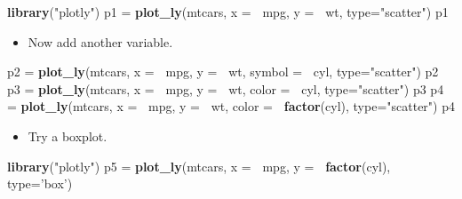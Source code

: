 \documentclass[]{article}
\newenvironment{Shaded}{\begin{snugshade}}{\end{snugshade}}
\newcommand{\DataTypeTok}[1]{\textcolor[rgb]{0.13,0.29,0.53}{#1}}
\newcommand{\KeywordTok}[1]{\textcolor[rgb]{0.13,0.29,0.53}{\textbf{#1}}}
\newcommand{\NormalTok}[1]{#1}
\newcommand{\OperatorTok}[1]{\textcolor[rgb]{0.81,0.36,0.00}{\textbf{#1}}}
\newcommand{\StringTok}[1]{\textcolor[rgb]{0.31,0.60,0.02}{#1}}
\providecommand{\tightlist}{%
  \setlength{\itemsep}{0pt}\setlength{\parskip}{0pt}}
\begin{document}
\begin{Shaded}
\begin{Highlighting}[]
\KeywordTok{library}\NormalTok{(}\StringTok{"plotly"}\NormalTok{)}
\NormalTok{p1 =}\StringTok{ }\KeywordTok{plot_ly}\NormalTok{(mtcars, }\DataTypeTok{x =} \OperatorTok{~}\NormalTok{mpg, }\DataTypeTok{y =} \OperatorTok{~}\NormalTok{wt, }\DataTypeTok{type=}\StringTok{"scatter"}\NormalTok{) }
\NormalTok{p1}
\end{Highlighting}
\end{Shaded}

\begin{itemize}
\tightlist
\item
  Now add another variable.
\end{itemize}

\begin{Shaded}
\begin{Highlighting}[]
\NormalTok{p2 =}\StringTok{ }\KeywordTok{plot_ly}\NormalTok{(mtcars, }\DataTypeTok{x =} \OperatorTok{~}\NormalTok{mpg, }\DataTypeTok{y =} \OperatorTok{~}\NormalTok{wt, }\DataTypeTok{symbol =} \OperatorTok{~}\NormalTok{cyl, }\DataTypeTok{type=}\StringTok{"scatter"}\NormalTok{) }
\NormalTok{p2}
\NormalTok{p3 =}\StringTok{ }\KeywordTok{plot_ly}\NormalTok{(mtcars, }\DataTypeTok{x =} \OperatorTok{~}\NormalTok{mpg, }\DataTypeTok{y =} \OperatorTok{~}\NormalTok{wt, }\DataTypeTok{color =} \OperatorTok{~}\NormalTok{cyl, }\DataTypeTok{type=}\StringTok{"scatter"}\NormalTok{) }
\NormalTok{p3}
\NormalTok{p4 =}\StringTok{ }\KeywordTok{plot_ly}\NormalTok{(mtcars, }\DataTypeTok{x =} \OperatorTok{~}\NormalTok{mpg, }\DataTypeTok{y =} \OperatorTok{~}\NormalTok{wt, }\DataTypeTok{color =} \OperatorTok{~}\KeywordTok{factor}\NormalTok{(cyl), }\DataTypeTok{type=}\StringTok{"scatter"}\NormalTok{) }
\NormalTok{p4}
\end{Highlighting}
\end{Shaded}

\begin{itemize}
\tightlist
\item
  Try a boxplot.
\end{itemize}

\begin{Shaded}
\begin{Highlighting}[]
\KeywordTok{library}\NormalTok{(}\StringTok{"plotly"}\NormalTok{)}
\NormalTok{p5 =}\StringTok{ }\KeywordTok{plot_ly}\NormalTok{(mtcars, }\DataTypeTok{x =} \OperatorTok{~}\NormalTok{mpg, }\DataTypeTok{y =} \OperatorTok{~}\KeywordTok{factor}\NormalTok{(cyl), }\DataTypeTok{type=}\StringTok{'box'}\NormalTok{) }
\end{Highlighting}
\end{Shaded}
\end{document}

